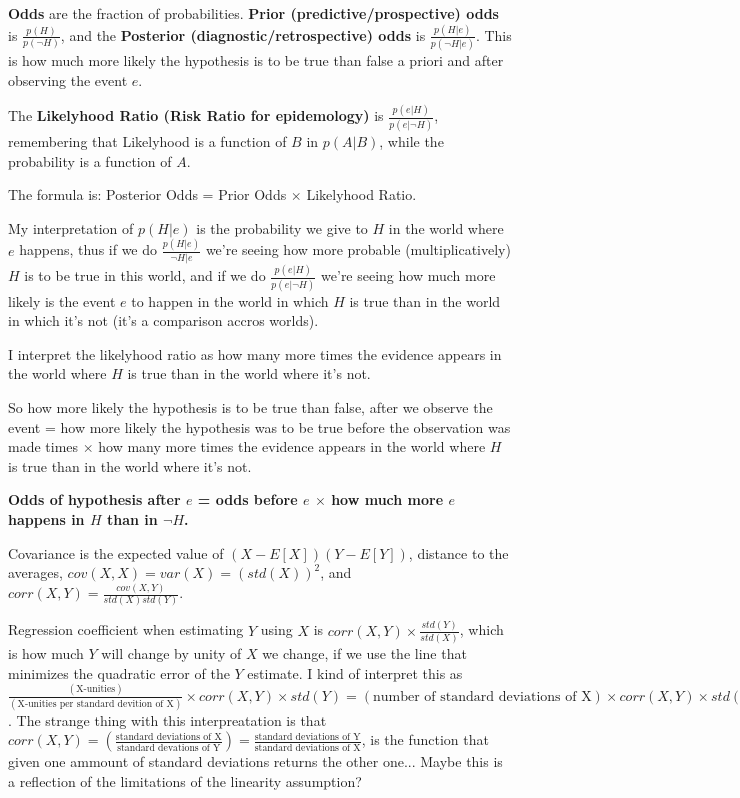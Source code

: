 \textbf{Odds} are the fraction of probabilities. \textbf{Prior (predictive/prospective) odds} is $\frac{p(H)}{p(\neg H)}$, and the \textbf{Posterior (diagnostic/retrospective) odds} is $\frac{p(H|e)}{p(\neg H|e)}$. This is how much more likely the hypothesis is to be true than false a priori and after observing the event $e$. 

The \textbf{Likelyhood Ratio (Risk Ratio for epidemology)} is $\frac{p(e|H)}{p(e|\neg H)}$, remembering that Likelyhood is a function of $B$ in $p(A|B)$, while the probability is a function of $A$.

The formula is: Posterior Odds = Prior Odds $\times$ Likelyhood Ratio.

My interpretation of $p(H|e)$ is the probability we give to $H$ in the world where $e$ happens, thus if we do $\frac{p(H|e)}{\neg H|e}$ we're seeing how more probable (multiplicatively) $H$ is to be true in this world, and if we do $\frac{p(e|H)}{p(e|\neg H)}$ we're seeing how much more likely is the event $e$ to happen in the world in which $H$ is true than in the world in which it's not (it's a comparison accros worlds).

I interpret the likelyhood ratio as how many more times the evidence appears in the world where $H$ is true than in the world where it's not.

So how more likely the hypothesis is to be true than false, after we observe the event = how more likely the hypothesis was to be true before the observation was made times $\times$ how many more times the evidence appears in the world where $H$ is true than in the world where it's not.

\textbf{Odds of hypothesis after $e$ = odds before $e$ $\times$ how much more $e$ happens in $H$ than in $\neg H$.}

Covariance is the expected value of $(X-E[X])(Y-E[Y])$, distance to the averages, $cov(X,X) = var(X) = (std(X))^2$, and $corr(X,Y) = \frac{cov(X,Y)}{std(X)std(Y)}$.

Regression coefficient when estimating $Y$ using $X$ is $corr(X,Y)\times \frac{std(Y)}{std(X)}$, which is how much $Y$ will change by unity of $X$ we change, if we use the line that minimizes the quadratic error of the $Y$ estimate. I kind of interpret this as $\frac{(\text{X-unities})}{(\text{X-unities per standard devition of X})} \times corr(X,Y) \times std(Y) = (\text{number of standard deviations of X}) \times corr(X,Y) \times std(Y) = (\text{number of standard deviations of Y}) \times (\text{Y-unities per standard deviations of Y}) = (\text{Y-unities})$. The strange thing with this interpreatation is that $corr(X,Y) = (\frac{\text{standard deviations of X}}{\text{standard devations of Y}}) = \frac{\text{standard deviations of Y}}{\text{standard deviations of X}}$, is the function that given one ammount of standard deviations returns the other one... Maybe this is a reflection of the limitations of the linearity assumption?

